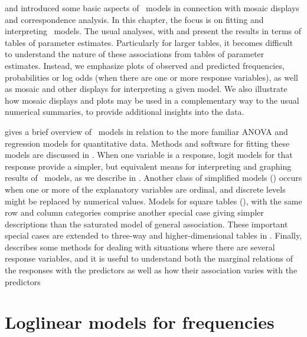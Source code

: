 \documentclass[11pt]{book}\usepackage[]{graphicx}\usepackage[]{color}
\begin{document}
 and  introduced some basic aspects of
\loglin\ models in connection with mosaic displays and correspondence analysis.
In this chapter, the focus is on fitting and interpreting
\loglin\ models.
The usual analyses, with  and
present the results in terms of tables of parameter
estimates.  Particularly for larger tables, it becomes difficult
to understand the nature of these associations from tables
of parameter estimates.  Instead, we emphasize plots of observed
and predicted frequencies,
probabilities or log odds (when there are one or more response
variables), as well as mosaic and other displays for interpreting a given
model.
We also illustrate how mosaic displays and \ca plots may be used
in a complementary way to the usual numerical summaries, to provide
additional insights into the data.

 gives a brief overview of \loglin\
models in relation to the more familiar ANOVA and regression models
for quantitative data.
Methods and software for fitting these models are discussed in
.
When one variable is a response, logit models for that response provide
a simpler, but equivalent means for interpreting and graphing
results of \loglin\ models, as we describe in .
Another class of simplified models (\secref{sec:loglin-ordinal})
occurs when one or more of the explanatory variables are ordinal,
and discrete levels might be replaced by numerical values.
Models for square tables (), with the same row and column categories
comprise another special case giving simpler descriptions than the saturated model of
general association. These important special cases are extended to three-way and
higher-dimensional tables in \secref{sec:loglin-3wayord}.
Finally,  describes some methods for dealing with situations
where there are several response variables, and it is useful to understand both
the marginal relations of the responses with the predictors as well as how their
association varies with the predictors

\section{Loglinear models for frequencies}\label{sec:loglin-counts}
\end{document}

